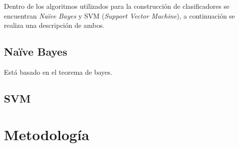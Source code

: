 Dentro de los algoritmos utilizados para la construcción de clasificadores se encuentran \textit{Naïve Bayes} y SVM (\textit{Support Vector Machine}), a continuación se realiza una descripción de ambos. 

	\subsection{Naïve Bayes}
	Está basado en el teorema de bayes. 

	\subsection{SVM}


\section{Metodología}
\label{sec:MetodologiaDetalle}


